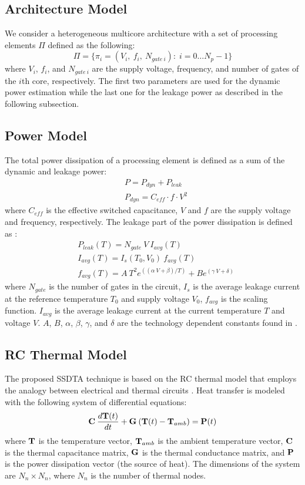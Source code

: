 \subsection{Architecture Model}
We consider a heterogeneous multicore architecture with a set of processing elements $\Pi$ defined as the following:
\[
  \Pi = \{ \pi_i = (V_i, \: f_i, \: N_{gate \: i}): \; i = 0 \dots N_p - 1 \}
\]
where $V_i$, $f_i$, and $N_{gate \: i}$ are the supply voltage, frequency, and number of gates \cite{liao2005} of the $i$th core, respectively. The first two parameters are used for the dynamic power estimation while the last one for the leakage power as described in the following subsection.

\subsection{Power Model}
The total power dissipation of a processing element is defined as a sum of the dynamic and leakage power:
\begin{align*}
  & P = P_{dyn} + P_{leak} \\
  & P_{dyn} = C_{eff} \cdot f \cdot V^2
\end{align*}
where $C_{eff}$ is the effective switched capacitance, $V$ and $f$ are the supply voltage and frequency, respectively. The leakage part of the power dissipation is defined as \cite{liao2005}:
\begin{align*}
  & P_{leak}(T) = N_{gate} \: V \: I_{avg}(T) \\
  & I_{avg}(T) = I_s(T_0, V_0) \: f_{avg}(T) \\
  & f_{avg}(T) = A \: T^2 e^{((\alpha \: V + \beta)/T)} + B e^{(\gamma \: V + \delta)}
\end{align*}
where $N_{gate}$ is the number of gates in the circuit, $I_s$ is the average leakage current at the reference temperature $T_0$ and supply voltage $V_0$, $f_{avg}$ is the scaling function. $I_{avg}$ is the average leakage current at the current temperature $T$ and voltage $V$. $A$, $B$, $\alpha$, $\beta$, $\gamma$, and $\delta$ are the technology dependent constants found in \cite{liao2005}.

\subsection{RC Thermal Model}
The proposed SSDTA technique is based on the RC thermal model that employs the analogy between electrical and thermal circuits \cite{kreith2000}. Heat transfer is modeled with the following system of differential equations:
\begin{equation} \label{eq:fourier-model}
  \mathbf{C} \: \frac{d\mathbf{T}(t)}{dt} + \mathbf{G} \: (\mathbf{T}(t) - \mathbf{T}_{amb})= \mathbf{P}(t)
\end{equation}
where $\mathbf{T}$ is the temperature vector, $\mathbf{T}_{amb}$ is the ambient temperature vector, $\mathbf{C}$ is the thermal capacitance matrix, $\mathbf{G}$ is the thermal conductance matrix, and $\mathbf{P}$ is the power dissipation vector (the source of heat). The dimensions of the system are $N_n \times N_n$, where $N_n$ is the number of thermal nodes.


